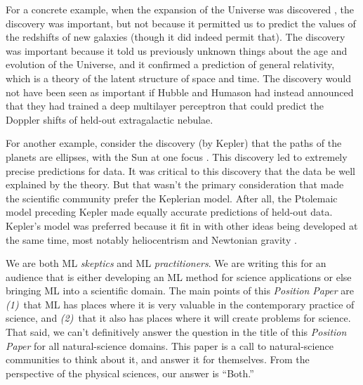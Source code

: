 \documentclass{article}
\newcommand{\documentname}{\textsl{Position Paper}}
\begin{document}
For a concrete example, when the expansion of the Universe was discovered \cite{expansion, expansion2}, the discovery was important, but not because it permitted us to predict the values of the redshifts of new galaxies (though it did indeed permit that).
The discovery was important because it told us previously unknown things about the age and evolution of the Universe, and it confirmed a prediction of general relativity, which is a theory of the latent structure of space and time.
The discovery would not have been seen as important if Hubble and Humason had instead announced that they had trained a deep multilayer perceptron that could predict the Doppler shifts of held-out extragalactic nebulae.

For another example, consider the discovery (by Kepler) that the paths of the planets are ellipses, with the Sun at one focus \cite{kepler}.
This discovery led to extremely precise predictions for data.
It was critical to this discovery that the data be well explained by the theory.
But that wasn’t the primary consideration that made the scientific community prefer the Keplerian model.
After all, the Ptolemaic model preceding Kepler made equally accurate predictions of held-out data.
Kepler’s model was preferred because it fit in with other ideas being developed at the same time, most notably heliocentrism \cite{copernicus} and Newtonian gravity \cite{newton}.

We are both ML \emph{skeptics} and ML \emph{practitioners}.
We are writing this for an audience that is either developing an ML method for science applications or else bringing ML into a scientific domain.
The main points of this \documentname{} are \textsl{(1)}~that ML has places where it is very valuable in the contemporary practice of science, and \textsl{(2)}~that it also has places where it will create problems for science.
That said, we can't definitively answer the question in the title of this \documentname{} for all natural-science domains.
This paper is a call to natural-science communities to think about it, and answer it for themselves.
From the perspective of the physical sciences, our answer is ``Both.''
\end{document}
